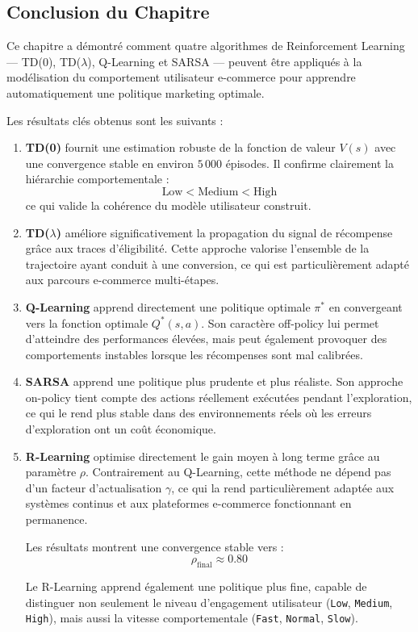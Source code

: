 \documentclass[11pt,a4paper]{article}
\begin{document}
\subsection{Conclusion du Chapitre}

\begin{phraseBox}
Ce chapitre a démontré comment quatre algorithmes de Reinforcement Learning — TD(0), TD($\lambda$), Q-Learning et SARSA — peuvent être appliqués à la modélisation du comportement utilisateur e-commerce pour apprendre automatiquement une politique marketing optimale.
\end{phraseBox}
Les résultats clés obtenus sont les suivants :

\begin{enumerate}

  \item \textbf{TD(0)} fournit une estimation robuste de la fonction de valeur $V(s)$ avec une convergence stable en environ $5\,000$ épisodes. Il confirme clairement la hiérarchie comportementale :
  \[
  \text{Low} < \text{Medium} < \text{High}
  \]
  ce qui valide la cohérence du modèle utilisateur construit.

  \item \textbf{TD($\lambda$)} améliore significativement la propagation du signal de récompense grâce aux traces d'éligibilité. Cette approche valorise l'ensemble de la trajectoire ayant conduit à une conversion, ce qui est particulièrement adapté aux parcours e-commerce multi-étapes.

  \item \textbf{Q-Learning} apprend directement une politique optimale $\pi^*$ en convergeant vers la fonction optimale $Q^*(s,a)$. Son caractère off-policy lui permet d'atteindre des performances élevées, mais peut également provoquer des comportements instables lorsque les récompenses sont mal calibrées.

  \item \textbf{SARSA} apprend une politique plus prudente et plus réaliste. Son approche on-policy tient compte des actions réellement exécutées pendant l'exploration, ce qui le rend plus stable dans des environnements réels où les erreurs d'exploration ont un coût économique.

  \item \textbf{R-Learning} optimise directement le gain moyen à long terme grâce au paramètre $\rho$. Contrairement au Q-Learning, cette méthode ne dépend pas d'un facteur d'actualisation $\gamma$, ce qui la rend particulièrement adaptée aux systèmes continus et aux plateformes e-commerce fonctionnant en permanence.

  Les résultats montrent une convergence stable vers :
  \[
  \rho_{\text{final}} \approx 0.80
  \]

  Le R-Learning apprend également une politique plus fine, capable de distinguer non seulement le niveau d'engagement utilisateur (\texttt{Low}, \texttt{Medium}, \texttt{High}), mais aussi la vitesse comportementale (\texttt{Fast}, \texttt{Normal}, \texttt{Slow}).

\end{enumerate}
\end{document}
